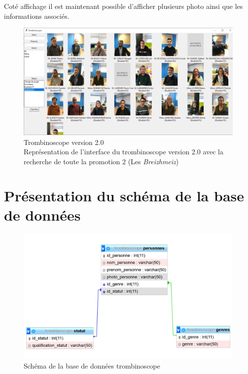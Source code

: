 \documentclass[french]{article}
\begin{document}
Coté affichage il est maintenant possible d'afficher plusieurs photo ainsi que les informations associés.\\

\begin{figure}[!htbp]
    \centering
    \includegraphics[width=\textwidth]{Image/trombinoscope_v2.PNG}
    \caption{Trombinoscope version 2.0 \\ Représentation de l'interface du trombinoscope version 2.0 avec la recherche de toute la promotion 2 (Les \textit{Breizhmeiz})}
    \label{fig:tromb_v2}
\end{figure}


\section{Présentation du schéma de la base de données}

\begin{figure}[!htbp]
    \centering
    \includegraphics[width=\textwidth]{Image/db_mysql.png}
    \caption{Schéma de la base de données trombinoscope}
    \label{fig:db}
\end{figure}
\end{document}
